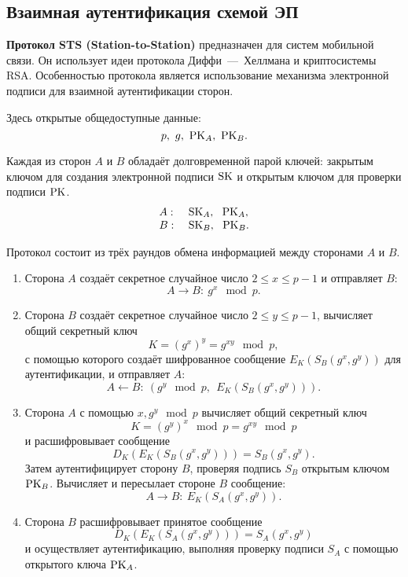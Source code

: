 \subsection{Взаимная аутентификация схемой ЭП}

\textbf{Протокол STS (Station-to-Station)} предназначен для систем мобильной связи. Он использует идеи протокола Диффи~---~Хеллмана и криптосистемы RSA. Особенностью протокола является использование механизма электронной подписи для взаимной аутентификации сторон.

Здесь открытые общедоступные данные:
    \[ p, ~ g, ~ \textrm{PK}_A, ~ \textrm{PK}_B. \]

Каждая из сторон $A$ и $B$ обладаёт долговременной парой ключей: закрытым ключом для создания электронной подписи $\textrm{SK}$ и открытым ключом для проверки подписи $\textrm{PK}$.
\[ \begin{array}{ll}
    A: & ~ \textrm{SK}_A, ~~ \textrm{PK}_A, \\
    B: & ~ \textrm{SK}_B, ~~ \textrm{PK}_B. \\
\end{array} \]

Протокол состоит из трёх раундов обмена информацией между сторонами $A$ и $B$.
\begin{enumerate}
    \item Сторона $A$ создаёт секретное случайное число $2 \leq x \leq p-1$ и отправляет $B$:
            \[ A \rightarrow B: ~ g^x \mod p. \]
    \item Сторона $B$ создаёт секретное случайное число $2 \leq y \leq p-1$, вычисляет общий секретный ключ
            \[ K = (g^x)^y = g^{xy} \mod p, \]
        с помощью которого создаёт шифрованное сообщение $E_K(S_B(g^x, g^y))$ для аутентификации, и отправляет $A$:
            \[ A \leftarrow B: ~ \left( g^y \mod p, ~~ E_K( S_B( g^x, g^y)) \right). \]
    \item Сторона $A$ с помощью $x, g^y \mod p$ вычисляет общий секретный ключ
            \[ K = (g^y)^x \mod p = g^{xy} \mod p \]
        и расшифровывает сообщение
            \[ D_K( E_K( S_B( g^x, g^y))) = S_B( g^x, g^y). \]
            Затем аутентифицирует сторону $B$, проверяя подпись $S_B$ открытым ключом $\textrm{PK}_B$. Вычисляет и пересылает стороне $B$ сообщение:
            \[ A \rightarrow B: ~ E_K( S_A( g^x, g^y)). \]
    \item Сторона $B$ расшифровывает принятое сообщение
            \[ D_K( E_K( S_A( g^x, g^y))) = S_A( g^x, g^y) \]
        и осуществляет аутентификацию, выполняя проверку подписи $S_A$ с помощью открытого ключа $\textrm{PK}_A$.
\end{enumerate}
